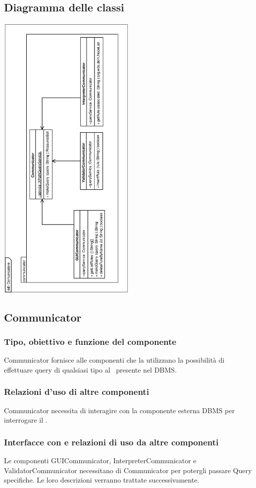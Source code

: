 \documentclass[11pt,titlepage,a4paper]{report}
\begin{document}
\subsection{Diagramma delle classi}
\begin{center}
\includegraphics[width=0.5\textwidth, angle=-90]{DiagrammaClassi/Comunicatore.eps}
\end{center}
\subsection{Communicator}
\subsubsection{Tipo, obiettivo e funzione del componente}
Communicator fornisce alle componenti che la utilizzano la possibilit\`a di effettuare query di qualsiasi tipo al \re\ presente nel DBMS.
\subsubsection{Relazioni d'uso di altre componenti}
Communicator necessita di interagire con la componente esterna DBMS per interrogare il \re.
\subsubsection{Interfacce con e relazioni di uso da altre componenti}
Le componenti GUICommunicator, InterpreterCommunicator e ValidatorCommunicator necessitano di Communicator per potergli passare Query specifiche. Le loro descrizioni verranno trattate successivamente.
\end{document}
